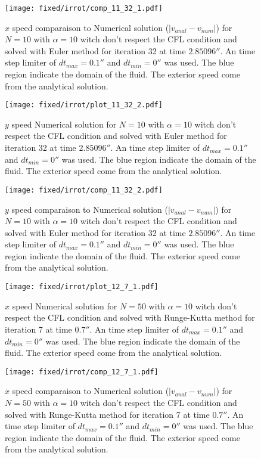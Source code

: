 \begin{figure}
\texttt{[image: fixed/irrot/comp\_11\_32\_1.pdf]}
\caption{$x$ speed comparaison to Numerical solution ($|v_{anal}-v_{num}|$) for $N=10$ with $\alpha=10$ witch don't respect the CFL condition and solved with Euler method
for iteration 32 at time $\unit{2.85096}{\second}$.
An time step limiter of $dt_{max}=\unit{0.1}{\second}$ and $dt_{min}=\unit{0}{\second}$ was used.
The blue region indicate the domain of the fluid. The exterior speed come from the analytical solution.
\label{fix:comp_11_32_1}
}
\end{figure}
\begin{figure}
\texttt{[image: fixed/irrot/plot\_11\_32\_2.pdf]}
\caption{$y$ speed Numerical solution for $N=10$ with $\alpha=10$ witch don't respect the CFL condition and solved with Euler method
for iteration 32 at time $\unit{2.85096}{\second}$.
An time step limiter of $dt_{max}=\unit{0.1}{\second}$ and $dt_{min}=\unit{0}{\second}$ was used.
The blue region indicate the domain of the fluid. The exterior speed come from the analytical solution.
\label{fix:plot_11_32_2}
}
\end{figure}

\begin{figure}
\texttt{[image: fixed/irrot/comp\_11\_32\_2.pdf]}
\caption{$y$ speed comparaison to Numerical solution ($|v_{anal}-v_{num}|$) for $N=10$ with $\alpha=10$ witch don't respect the CFL condition and solved with Euler method
for iteration 32 at time $\unit{2.85096}{\second}$.
An time step limiter of $dt_{max}=\unit{0.1}{\second}$ and $dt_{min}=\unit{0}{\second}$ was used.
The blue region indicate the domain of the fluid. The exterior speed come from the analytical solution.
\label{fix:comp_11_32_2}
}
\end{figure}

\clearpage

\begin{figure}
\texttt{[image: fixed/irrot/plot\_12\_7\_1.pdf]}
\caption{$x$ speed Numerical solution for $N=50$ with $\alpha=10$ witch don't respect the CFL condition and solved with Runge-Kutta method
for iteration 7 at time $\unit{0.7}{\second}$.
An time step limiter of $dt_{max}=\unit{0.1}{\second}$ and $dt_{min}=\unit{0}{\second}$ was used.
The blue region indicate the domain of the fluid. The exterior speed come from the analytical solution.
\label{fix:plot_12_7_1}
}
\end{figure}

\begin{figure}
\texttt{[image: fixed/irrot/comp\_12\_7\_1.pdf]}
\caption{$x$ speed comparaison to Numerical solution ($|v_{anal}-v_{num}|$) for $N=50$ with $\alpha=10$ witch don't respect the CFL condition and solved with Runge-Kutta method
for iteration 7 at time $\unit{0.7}{\second}$.
An time step limiter of $dt_{max}=\unit{0.1}{\second}$ and $dt_{min}=\unit{0}{\second}$ was used.
The blue region indicate the domain of the fluid. The exterior speed come from the analytical solution.
\label{fix:comp_12_7_1}
}
\end{figure}

